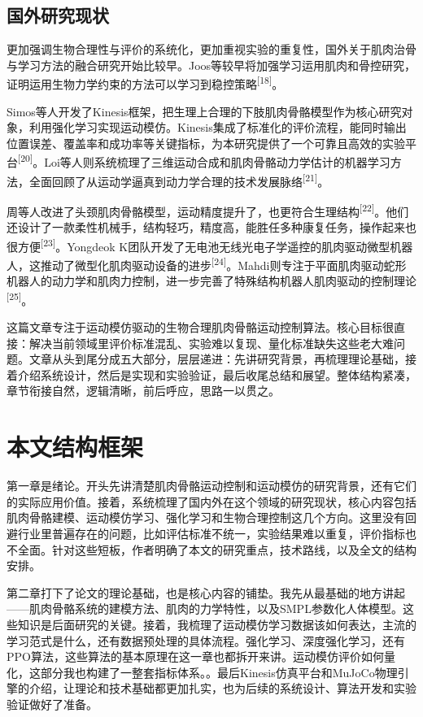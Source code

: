 \subsection{国外研究现状}


更加强调生物合理性与评价的系统化，更加重视实验的重复性，国外关于肌肉治骨与学习方法的融合研究开始比较早。Joos等较早将加强学习运用肌肉和骨控研究，证明运用生物力学约束的方法可以学习到稳控策略\textsuperscript{[18]}。

Simos等人开发了Kinesis框架，把生理上合理的下肢肌肉骨骼模型作为核心研究对象，利用强化学习实现运动模仿。Kinesis集成了标准化的评价流程，能同时输出位置误差、覆盖率和成功率等关键指标，为本研究提供了一个可靠且高效的实验平台\textsuperscript{[20]}。Loi等人则系统梳理了三维运动合成和肌肉骨骼动力学估计的机器学习方法，全面回顾了从运动学逼真到动力学合理的技术发展脉络\textsuperscript{[21]}。

周等人改进了头颈肌肉骨骼模型，运动精度提升了，也更符合生理结构\textsuperscript{[22]}。他们还设计了一款柔性机械手，结构轻巧，精度高，能胜任多种康复任务，操作起来也很方便\textsuperscript{[23]}。Yongdeok
K团队开发了无电池无线光电子学遥控的肌肉驱动微型机器人，这推动了微型化肌肉驱动设备的进步\textsuperscript{[24]}。Mahdi则专注于平面肌肉驱动蛇形机器人的动力学和肌肉力控制，进一步完善了特殊结构机器人肌肉驱动的控制理论\textsuperscript{[25]}。

这篇文章专注于运动模仿驱动的生物合理肌肉骨骼运动控制算法。核心目标很直接：解决当前领域里评价标准混乱、实验难以复现、量化标准缺失这些老大难问题。文章从头到尾分成五大部分，层层递进：先讲研究背景，再梳理理论基础，接着介绍系统设计，然后是实现和实验验证，最后收尾总结和展望。整体结构紧凑，章节衔接自然，逻辑清晰，前后呼应，思路一以贯之。

\section{本文结构框架}\label{ux672cux6587ux7ed3ux6784ux6846ux67b6}

第一章是绪论。开头先讲清楚肌肉骨骼运动控制和运动模仿的研究背景，还有它们的实际应用价值。接着，系统梳理了国内外在这个领域的研究现状，核心内容包括肌肉骨骼建模、运动模仿学习、强化学习和生物合理控制这几个方向。这里没有回避行业里普遍存在的问题，比如评估标准不统一，实验结果难以重复，评价指标也不全面。针对这些短板，作者明确了本文的研究重点，技术路线，以及全文的结构安排。

第二章打下了论文的理论基础，也是核心内容的铺垫。我先从最基础的地方讲起——肌肉骨骼系统的建模方法、肌肉的力学特性，以及SMPL参数化人体模型。这些知识是后面研究的关键。接着，我梳理了运动模仿学习数据该如何表达，主流的学习范式是什么，还有数据预处理的具体流程。强化学习、深度强化学习，还有PPO算法，这些算法的基本原理在这一章也都拆开来讲。运动模仿评价如何量化，这部分我也构建了一整套指标体系。。最后Kinesis仿真平台和MuJoCo物理引擎的介绍，让理论和技术基础都更加扎实，也为后续的系统设计、算法开发和实验验证做好了准备。

